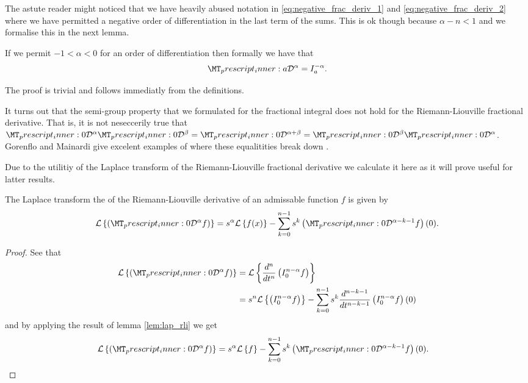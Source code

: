 The astute reader might noticed that we have heavily abused notation in \eqref{eq:negative_frac_deriv_1} and \eqref{eq:negative_frac_deriv_2} where we have permitted a negative order of differentiation in the last term of the sums. This is ok though because $ \alpha - n < 1 $ and we formalise this in the next lemma. 

\begin{lemma}
    If we permit $ -1 < \alpha < 0 $ for an order of differentiation then formally we have that
    \begin{align}
        \prescript{}{a}{\mathcal{D}}^\alpha = I_a^{-\alpha}.
    \end{align}
\end{lemma}
The proof is trivial and follows immediatly from the definitions.



It turns out that the semi-group property that we formulated for the fractional integral does not hold for the Riemann-Liouville fractional derivative.
That is, it is not neseccerily true that $ \prescript{}{0}{\mathcal{D}}^\alpha \prescript{}{0}{\mathcal{D}}^\beta =  \prescript{}{0}{\mathcal{D}}^{\alpha + \beta} =  \prescript{}{0}{\mathcal{D}}^\beta  \prescript{}{0}{\mathcal{D}}^\alpha $. Gorenflo and Mainardi give excelent examples of where these equalitities break down \cite{Gorenflo1997}.

Due to the utilitiy of the Laplace transform of the Riemann-Liouville fractional derivative we calculate it here as it will prove useful for latter results.
\begin{lemma}
\label{lem:lap_rld}
	The Laplace transform the of the Riemann-Liouville derivative of an admissable function $ f $ is given by
	\begin{align}
		\mathcal{L} \left\{ \rld{0}{}{\alpha}{f} \right\} = s^\alpha \mathcal{L} \left\{ f(x) \right\} - \sum_{k=0}^{n-1} s^{k} \rld{0}{}{\alpha-k-1}{f}(0).
	\end{align}
\end{lemma}
\begin{proof}
	See that
	\begin{align}
		\laplace{ \rld{0}{}{\alpha}{f} } &= \laplace{ \der{}{t}{n} \rli{0}{n-\alpha}{f} } \\
		&= s^n\laplace{\rli{0}{n-\alpha}{f}} - \sum_{k=0}^{n-1} s^k \der{}{t}{n-k-1} \rli{0}{n-\alpha}{f}(0)
	\end{align}
	and by applying the result of lemma \ref{lem:lap_rli} we get
	\begin{align}
			\mathcal{L} \left\{\rld{0}{}{\alpha}{f} \right\} &= s^\alpha \laplace{f} - \sum_{k=0}^{n-1} s^{k} \rld{0}{}{\alpha - k - 1}{f}(0). 
	\end{align} 
\end{proof}

